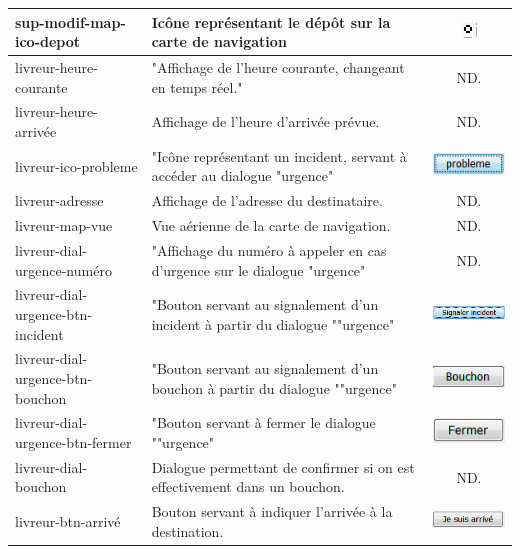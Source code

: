 \documentclass{report}
\begin{document}
\begin{longtable}{|p{5cm}|p{5cm}|c|}
sup-modif-map-ico-depot&Icône représentant le dépôt sur la carte de navigation&\includegraphics{images/ico-liv-liv.jpg}\\\hline
livreur-heure-courante&"Affichage de l'heure courante, changeant en temps réel."&ND.\\\hline
livreur-heure-arrivée&Affichage de l'heure d'arrivée prévue.&ND.\\\hline
livreur-ico-probleme&"Icône représentant un incident, servant à accéder au dialogue "urgence"&\includegraphics{images/btn-liv-prob.jpg}\\\hline
livreur-adresse&Affichage de l'adresse du destinataire.&ND.\\\hline
livreur-map-vue&Vue aérienne de la carte de navigation.&ND.\\\hline
livreur-dial-urgence-numéro&"Affichage du numéro à appeler en cas d'urgence sur le dialogue "urgence"&ND.\\\hline
livreur-dial-urgence-btn-incident&"Bouton servant au signalement d'un incident à partir du dialogue ""urgence"&\includegraphics{images/btn-liv-signalinc.jpg}\\\hline
livreur-dial-urgence-btn-bouchon&"Bouton servant au signalement d'un bouchon à partir du dialogue ""urgence"&\includegraphics{images/btn-liv-signalbouc.jpg}\\\hline
livreur-dial-urgence-btn-fermer&"Bouton servant à fermer le dialogue ""urgence"&\includegraphics{images/btn-liv-signalferm.jpg}\\\hline
livreur-dial-bouchon&Dialogue permettant de confirmer si on est effectivement dans un bouchon.&ND.\\\hline
livreur-btn-arrivé&Bouton servant à indiquer l'arrivée à la destination.&\includegraphics{images/btn-liv-arr.jpg}\\\hline

\end{longtable}
\end{document}
